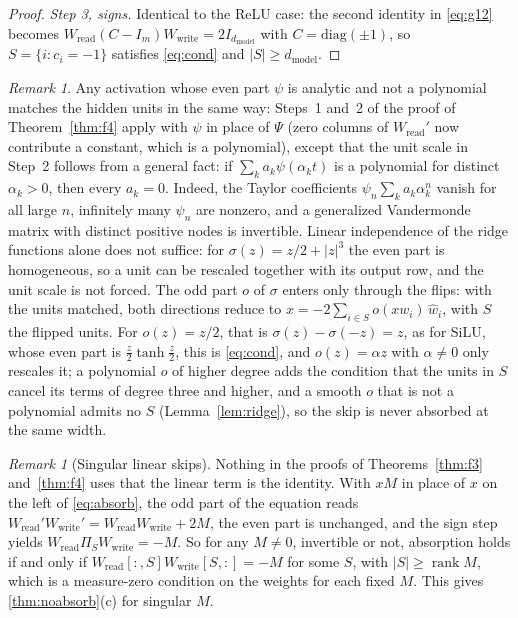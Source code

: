 \documentclass[10pt]{article}
\theoremstyle{definition}
\theoremstyle{remark}
\newtheorem{remark}[theorem]{Remark}
\newcommand{\Wread}{W_{\mathrm{read}}}
\newcommand{\Wwrite}{W_{\mathrm{write}}}
\newcommand{\dm}{d_{\mathrm{model}}}
\begin{document}
\begin{proof}
\emph{Step 3, signs.} Identical to the ReLU case: the second identity in \eqref{eq:g12} becomes $\Wread(C - I_m)\Wwrite = 2I_{\dm}$ with $C = \mathrm{diag}(\pm1)$, so $S = \{i : c_i = -1\}$ satisfies \eqref{eq:cond} and $|S| \ge \dm$.
\end{proof}

\begin{remark}\label{rem:evenpart}
Any activation whose even part $\psi$ is analytic and not a polynomial matches the hidden units in the same way: Steps~1 and~2 of the proof of Theorem~\ref{thm:f4} apply with $\psi$ in place of $\Psi$ (zero columns of $\Wread'$ now contribute a constant, which is a polynomial), except that the unit scale in Step~2 follows from a general fact: if $\sum_k a_k\psi(\alpha_kt)$ is a polynomial for distinct $\alpha_k > 0$, then every $a_k = 0$. Indeed, the Taylor coefficients $\psi_n\sum_k a_k\alpha_k^n$ vanish for all large $n$, infinitely many $\psi_n$ are nonzero, and a generalized Vandermonde matrix with distinct positive nodes is invertible. Linear independence of the ridge functions alone does not suffice: for $\sigma(z) = z/2 + \lvert z\rvert^3$ the even part is homogeneous, so a unit can be rescaled together with its output row, and the unit scale is not forced. The odd part $o$ of $\sigma$ enters only through the flips: with the units matched, both directions reduce to $x = -2\sum_{i \in S} o(xw_i)\,\hat w_i$, with $S$ the flipped units. For $o(z) = z/2$, that is $\sigma(z) - \sigma(-z) = z$, as for SiLU, whose even part is $\tfrac z2\tanh\tfrac z2$, this is \eqref{eq:cond}, and $o(z) = \alpha z$ with $\alpha \neq 0$ only rescales it; a polynomial $o$ of higher degree adds the condition that the units in $S$ cancel its terms of degree three and higher, and a smooth $o$ that is not a polynomial admits no $S$ (Lemma~\ref{lem:ridge}), so the skip is never absorbed at the same width.
\end{remark}

\begin{remark}[Singular linear skips]\label{rem:singular}
Nothing in the proofs of Theorems~\ref{thm:f3} and~\ref{thm:f4} uses that the linear term is the identity. With $xM$ in place of $x$ on the left of \eqref{eq:absorb}, the odd part of the equation reads $\Wread'\Wwrite' = \Wread\Wwrite + 2M$, the even part is unchanged, and the sign step yields $\Wread\Pi_S\Wwrite = -M$. So for any $M \neq 0$, invertible or not, absorption holds if and only if $\Wread[{:},S]\Wwrite[S,{:}] = -M$ for some $S$, with $|S| \ge \operatorname{rank}M$, which is a measure-zero condition on the weights for each fixed $M$. This gives \cref{thm:noabsorb}(c) for singular $M$.
\end{remark}
\end{document}
